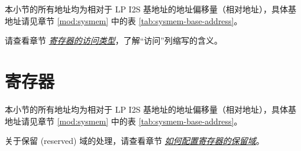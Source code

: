 \documentclass[main\_\_CN.tex]{subfiles}
\begin{document}
本小节的所有地址均为相对于 LP I2S 基地址的地址偏移量（相对地址），具体基地址请见章节 \ref{mod:sysmem} \textit{} 中的表 \ref{tab:sysmem-base-address}。

请查看章节 \hyperref[glossary-access-types]{\textit{寄存器的访问类型}}，了解“访问”列缩写的含义。






\newpage
\section{寄存器}

本小节的所有地址均为相对于 LP I2S 基地址的地址偏移量（相对地址），具体基地址请见章节 \ref{mod:sysmem} \textit{} 中的表 \ref{tab:sysmem-base-address}。

关于保留 (reserved) 域的处理，请查看章节 \hyperref[programming-reserved-field]{\textit{如何配置寄存器的保留域}}。


\end{document}
